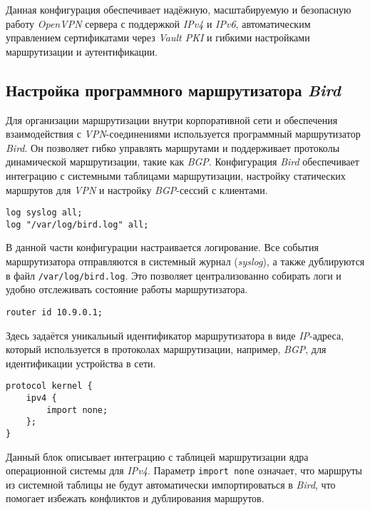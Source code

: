 Данная конфигурация обеспечивает надёжную, масштабируемую и безопасную работу \textit{OpenVPN} сервера с поддержкой \textit{IPv4} и \textit{IPv6}, автоматическим управлением сертификатами через \textit{Vault PKI} и гибкими настройками маршрутизации и аутентификации.

\subsection[ Настройка программного маршрутизатора \textit{Bird}]{Настройка программного маршрутизатора \textit{Bird}}

Для организации маршрутизации внутри корпоративной сети и обеспечения взаимодействия с \textit{VPN}-соединениями используется программный маршрутизатор \textit{Bird}. Он позволяет гибко управлять маршрутами и поддерживает протоколы динамической маршрутизации, такие как \textit{BGP}. Конфигурация \textit{Bird} обеспечивает интеграцию с системными таблицами маршрутизации, настройку статических маршрутов для \textit{VPN} и настройку \textit{BGP}-сессий с клиентами.

\begin{lstlisting}
log syslog all;
log "/var/log/bird.log" all;
\end{lstlisting}

В данной части конфигурации настраивается логирование. Все события маршрутизатора отправляются в системный журнал (\textit{syslog}), а также дублируются в файл \lstinline{/var/log/bird.log}. Это позволяет централизованно собирать логи и удобно отслеживать состояние работы маршрутизатора.

\begin{lstlisting}
router id 10.9.0.1;
\end{lstlisting}

Здесь задаётся уникальный идентификатор маршрутизатора в виде \textit{IP}-адреса, который используется в протоколах маршрутизации, например, \textit{BGP}, для идентификации устройства в сети.

\begin{lstlisting}
protocol kernel {
    ipv4 {
        import none;
    };
}
\end{lstlisting}

Данный блок описывает интеграцию с таблицей маршрутизации ядра операционной системы для \textit{IPv4}. Параметр \lstinline{import none} означает, что маршруты из системной таблицы не будут автоматически импортироваться в \textit{Bird}, что помогает избежать конфликтов и дублирования маршрутов.

